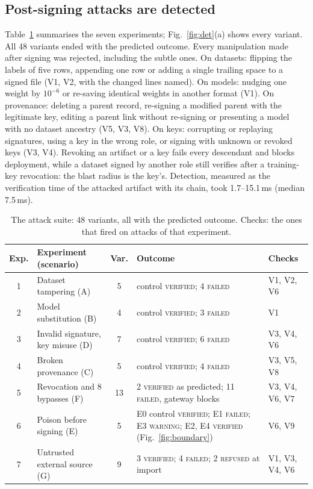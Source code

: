 \documentclass[conference]{IEEEtran}
\newcommand{\st}[1]{\textsc{#1}}
\begin{document}
\subsection{Post-signing attacks are detected}
Table~\ref{tab:suite} summarises the seven experiments; Fig.~\ref{fig:det}(a) shows every variant. All 48 variants ended with the predicted outcome. Every manipulation made after signing was rejected, including the subtle ones. On datasets: flipping the labels of five rows, appending one row or adding a single trailing space to a signed file (V1, V2, with the changed lines named). On models: nudging one weight by $10^{-6}$ or re-saving identical weights in another format (V1). On provenance: deleting a parent record, re-signing a modified parent with the legitimate key, editing a parent link without re-signing or presenting a model with no dataset ancestry (V5, V3, V8). On keys: corrupting or replaying signatures, using a key in the wrong role, or signing with unknown or revoked keys (V3, V4). Revoking an artifact or a key fails every descendant and blocks deployment, while a dataset signed by another role still verifies after a training-key revocation: the blast radius is the key's. Detection, measured as the verification time of the attacked artifact with its chain, took 1.7--15.1\,ms (median 7.5\,ms).

\begin{table}[t]
\caption{The attack suite: 48 variants, all with the predicted outcome. Checks: the ones that fired on attacks of that experiment.}
\label{tab:suite}
\centering
\scriptsize
\setlength{\tabcolsep}{2.5pt}
\begin{tabular}{@{}c>{\raggedright}p{2.45cm}c>{\raggedright}p{2.6cm}>{\raggedright\arraybackslash}p{1.05cm}@{}}
\toprule
Exp. & Experiment (scenario) & Var. & Outcome & Checks \\
\midrule
1 & Dataset tampering (A) & 5 & control \st{verified}; 4 \st{failed} & V1, V2, V6 \\
2 & Model substitution (B) & 4 & control \st{verified}; 3 \st{failed} & V1 \\
3 & Invalid signature, key misuse (D) & 7 & control \st{verified}; 6 \st{failed} & V3, V4, V6 \\
4 & Broken provenance (C) & 5 & control \st{verified}; 4 \st{failed} & V3, V5, V8 \\
5 & Revocation and 8 bypasses (F) & 13 & 2 \st{verified} as predicted; 11 \st{failed}, gateway blocks & V3, V4, V6, V7 \\
6 & Poison before signing (E) & 5 & E0 control \st{verified}; E1 \st{failed}; E3 \st{warning}; E2, E4 \st{verified} (Fig.~\ref{fig:boundary}) & V6, V9 \\
7 & Untrusted external source (G) & 9 & 3 \st{verified}; 4 \st{failed}; 2 \st{refused} at import & V1, V3, V4, V6 \\
\bottomrule
\end{tabular}
\end{table}
\end{document}
